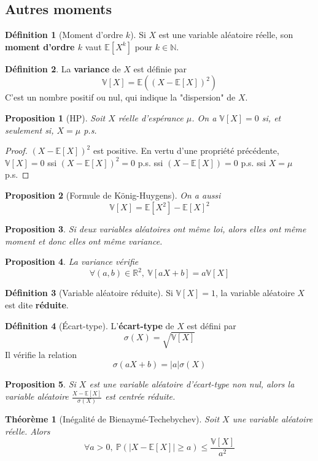 \documentclass[french]{book}
\renewcommand{\P}{\mathbb{P}}
\newcommand{\N}{\mathbb{N}}
\newcommand{\R}{\mathbb{R}}
\newcommand{\E}{\mathbb{E}}
\newcommand{\V}{\mathbb{V}}
\theoremstyle{plain}
\newtheorem{thm}{Théorème}[chapter]
\newtheorem{prop}{Proposition}[chapter]
\theoremstyle{definition}
\newtheorem{dfn}{Définition}[chapter]
\theoremstyle{remark}
\begin{document}
\subsection{Autres moments}
\begin{dfn}[Moment d'ordre $k$]
	Si $X$ est une variable aléatoire réelle, son \textbf{moment d'ordre $k$} vaut $\E[X^k]$ pour $k\in\N$.
\end{dfn}
\begin{dfn}
	La \textbf{variance} de $X$ est définie par $$\V[X]=\E\left((X-\E[X])^2\right)$$ C'est un nombre positif ou nul, qui indique la "dispersion" de $X$.
\end{dfn}
\begin{prop}[HP]
	Soit $X$ réelle d'espérance $\mu$. On a $\V[X]=0$ si, et seulement si, $X=\mu$ p.s.
\end{prop}
\begin{proof}
	$(X-\E[X])^2$ est positive. En vertu d'une propriété précédente, $\V[X]=0$ ssi $(X-\E[X])^2=0$ p.s. ssi $(X-\E[X])=0$ p.s. ssi $X=\mu$ p.s.
\end{proof}
\begin{prop}[Formule de König-Huygens]
	On a aussi $$\V[X]=\E[X^2]-\E[X]^2$$
\end{prop}
\begin{prop}
	Si deux variables aléatoires ont même loi, alors elles ont même moment et donc elles ont même variance.
\end{prop}
\begin{prop}
	La variance vérifie $$\forall (a,b)\in\R^2,\ \V[aX+b]=a\V[X]$$
\end{prop}
\begin{dfn}[Variable aléatoire réduite]
	Si $\V[X]=1$, la variable aléatoire $X$ est dite \textbf{réduite}.
\end{dfn}
\begin{dfn}[Écart-type]
	L'\textbf{écart-type} de $X$ est défini par $$\sigma(X)=\sqrt{\V[X]}$$ Il vérifie la relation $$\sigma(aX+b)=\lvert a\rvert\sigma(X)$$
\end{dfn}
\begin{prop}
	Si $X$ est une variable aléatoire d'écart-type non nul, alors la variable aléatoire $\displaystyle \frac{X-\E[X]}{\sigma(X)}$ est centrée réduite.
\end{prop}
\begin{thm}[Inégalité de Bienaymé-Techebychev]
	Soit $X$ une variable aléatoire réelle. Alors $$\forall a>0,\ \P(\lvert X-\E[X]\rvert\geqslant a)\leqslant\frac{\V[X]}{a^2}$$
\end{thm}
\end{document}
